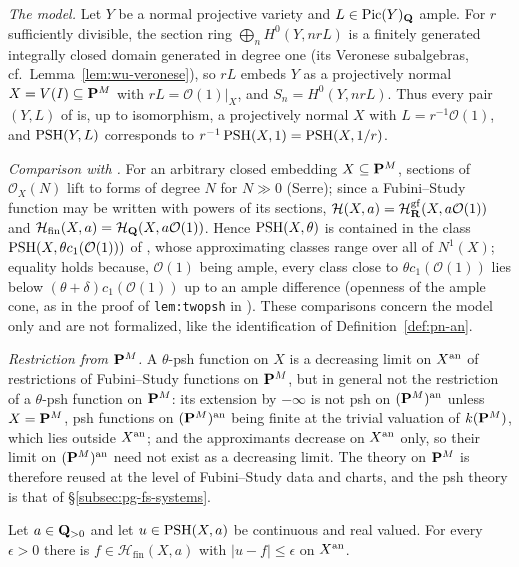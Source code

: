 \begin{remark}\label{rmk:pg-subvariety-psh-comparison}
\emph{The model.} Let $Y$ be a normal projective variety and $L\in\operatorname{Pic}(Y)_{\mathbf{Q}}$ ample. For $r$ sufficiently divisible, the section
ring $\bigoplus_nH^0(Y,nrL)$ is a finitely generated integrally closed domain generated in degree one (its Veronese
subalgebras, cf.\ Lemma~\ref{lem:wu-veronese}), so $rL$ embeds $Y$ as a projectively normal $X=V(I)\subseteq\mathbf{P}^M$ with
$rL=\mathcal O(1)|_X$, and $S_n=H^0(Y,nrL)$. Thus every pair $(Y,L)$ of \cite[Corollary~5.26]{FHX} is, up to isomorphism, a
projectively normal $X$ with $L=r^{-1}\mathcal O(1)$, and $\operatorname{PSH}(Y,L)$ corresponds to $r^{-1}\operatorname{PSH}(X,1)=\operatorname{PSH}(X,1/r)$.

\emph{Comparison with \cite[Definition~4.1]{BJ22}.} For an arbitrary closed embedding $X\subseteq\mathbf{P}^M$, sections of
$\mathcal O_X(N)$ lift to forms of degree $N$ for $N\gg0$ (Serre); since a Fubini--Study function may be written with powers of its
sections, $\mathcal H(X,a)=\mathcal H^{\mathrm{gf}}_{\mathbf{R}}(X,a\mathcal O(1))$ and $\mathcal H_{\mathrm{fin}}(X,a)=\mathcal H_{\mathbf{Q}}(X,a\mathcal O(1))$. Hence
$\operatorname{PSH}(X,\theta)$ is contained in the class $\operatorname{PSH}(X,\theta c_1(\mathcal O(1)))$ of \cite{BJ22}, whose approximating classes range over
all of $N^1(X)$; equality holds because, $\mathcal O(1)$ being ample, every class close to $\theta c_1(\mathcal O(1))$ lies below
$(\theta+\delta)c_1(\mathcal O(1))$ up to an ample difference (openness of the ample cone, as in the proof of \texttt{lem:twopsh} in \cite[\S4]{BJ22}). These comparisons concern the model only and are not formalized, like the identification of
Definition~\ref{def:pn-an}.

\emph{Restriction from $\mathbf{P}^M$.} A $\theta$-psh function on $X$ is a decreasing limit on $X^{\mathrm{an}}$ of restrictions of Fubini--Study
functions on $\mathbf{P}^M$, but in general not the restriction of a $\theta$-psh function on $\mathbf{P}^M$: its extension by $-\infty$ is not
psh on $(\mathbf{P}^M)^{\mathrm{an}}$ unless $X=\mathbf{P}^M$, psh functions on $(\mathbf{P}^M)^{\mathrm{an}}$ being finite at the trivial valuation of $k(\mathbf{P}^M)$, which lies
outside $X^{\mathrm{an}}$; and the approximants decrease on $X^{\mathrm{an}}$ only, so their limit on $(\mathbf{P}^M)^{\mathrm{an}}$ need not exist as a decreasing limit. The theory on $\mathbf{P}^M$ is
therefore reused at the level of Fubini--Study data and charts, and the psh theory is that of \S\ref{subsec:pg-fs-systems}.
\end{remark}

\begin{lemma}\label{lem:pg-uniform-approximation}
\leanok
{}
Let $a\in\mathbf{Q}_{>0}$ and let $u\in\operatorname{PSH}(X,a)$ be continuous and real valued. For every $\epsilon>0$ there is
$f\in\mathcal H_{\mathrm{fin}}(X,a)$ with $|u-f|\le\epsilon$ on $X^{\mathrm{an}}$.
\end{lemma}

